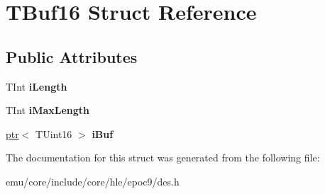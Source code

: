 \hypertarget{struct_t_buf16}{}\section{T\+Buf16 Struct Reference}
\label{struct_t_buf16}
\subsection*{Public Attributes}
\begin{DoxyCompactItemize}
\item 
\mbox{\label{struct_t_buf16_ac7ca08186527fc82952843bc7f575741}} 
T\+Int {\bfseries i\+Length}
\item 
\mbox{\label{struct_t_buf16_aadc31cf74e23b324c0582148a41d41af}} 
T\+Int {\bfseries i\+Max\+Length}
\item 
\mbox{\label{struct_t_buf16_abda45406b1299fc9b0498f314788fb67}} 
\mbox{\hyperlink{classeka2l1_1_1ptr}{ptr}}$<$ T\+Uint16 $>$ {\bfseries i\+Buf}
\end{DoxyCompactItemize}


The documentation for this struct was generated from the following file\+:\begin{DoxyCompactItemize}
\item 
emu/core/include/core/hle/epoc9/des.\+h\end{DoxyCompactItemize}
